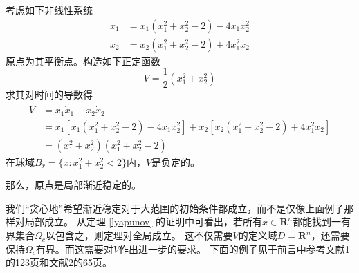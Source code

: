 \begin{example}[局部渐近稳定]
  考虑如下非线性系统\[\begin{aligned}\dot{x}_1&=x_1(x_1^2+x_2^2-2)-4x_1x_2^2\\\dot{x}_2&=x_2(x_1^2+x_2^2-2)+4x_1^2x_2\end{aligned}\]
  原点为其平衡点。构造如下正定函数\[V=\frac{1}{2}(x_1^2+x_2^2)\]
  求其对时间的导数得\[\begin{aligned}
    \dot{V}& =x_{1}\dot{x}_{1}+x_{2}\dot{x}_{2} \\
    &=x_{1}[x_{1}(x_{1}^{2}+x_{2}^{2}-2)-4x_{1}x_{2}^{2}]+x_{2}[x_{2}(x_{1}^{2}+x_{2}^{2}-2)+4x_{1}^{2}x_{2}] \\
    &=(x_1^2+x_2^2)(x_1^2+x_2^2-2)
    \end{aligned}\]
  在球域$B_r=\{x:x_1^2+x_2^2<2\}$内，$\dot{V}$是负定的。

  那么，原点是局部渐近稳定的。
\end{example}
我们“贪心地”希望渐近稳定对于大范围的初始条件都成立，而不是仅像上面例子那样对局部成立。
从定理 \ref{lyapunov} 的证明中可看出，若所有$x\in\mathbf{R}^n$都能找到一有界集合$\Omega_c$以包含之，则定理对全局成立。
这不仅需要$V$的定义域$D=\mathbf{R}^n$，还需要保持$\Omega_c$有界。而这需要对$V$作出进一步的要求。
下面的例子见于前言中参考文献1的123页和文献2的65页。

